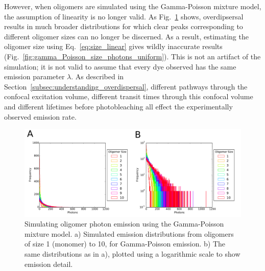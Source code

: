 However, when oligomers are simulated using the Gamma-Poisson mixture model, the assumption of linearity is no longer valid. As Fig.~\ref{fig:gamma_Poisson_size_photons} shows, overdipsersal results in much broader distributions for which clear peaks corresponding to different oligomer sizes can no longer be discerned. As a result, estimating the oligomer size using Eq.~\ref{eq:size_linear} gives wildly inaccurate results (Fig.~\ref{fig:gamma_Poisson_size_photons_uniform}). This is not an artifact of the simulation; it is not valid to assume that every dye observed has the same emission parameter $\lambda$. As described in Section~\ref{subsec:understanding_overdispersal}, different pathways through the confocal excitation volume, different transit times through this confocal volume and different lifetimes before photobleaching all effect the experimentally observed emission rate.

\begin{figure}
   \begin{center}
      \includegraphics*[clip=true, width=6.5in]{sizing/gamma_poisson_size_photons.pdf}
      \caption{Simulating oligomer photon emission using the Gamma-Poisson mixture model. a) Simulated emission distributions from oligomers of size 1 (monomer) to 10, for Gamma-Poisson emission. b) The same distributions as in a), plotted using a logarithmic scale to show emission detail.}
      \label{fig:gamma_Poisson_size_photons}
   \end{center}
\end{figure}

